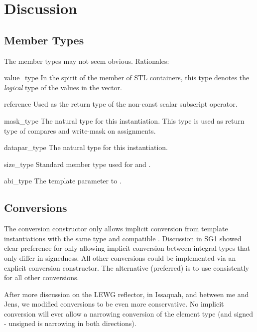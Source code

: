 \section{Discussion}

\subsection{Member Types}
The member types may not seem obvious.
Rationales:
\begin{typelist*}
  \item[value_type]
    In the spirit of the  member of STL containers, this type denotes the \emph{logical} type of the values in the vector.

  \item[reference]
    Used as the return type of the non-const scalar subscript operator.

  \item[mask_type]
    The natural \mask type for this \datapar instantiation.
    This type is used as return type of compares and write-mask on assignments.

  \item[datapar_type]
    The natural \datapar type for this \mask instantiation.

  \item[size_type]
    Standard member type used for  and .

  \item[abi_type]
    The  template parameter to \datapar.

\end{typelist*}

\subsection{Conversions}
The \datapar conversion constructor only allows implicit conversion from \datapar template instantiations with the same  type and compatible .
Discussion in SG1 showed clear preference for only allowing implicit conversion between integral types that only differ in signedness.
All other conversions could be implemented via an explicit conversion constructor.
The alternative (preferred) is to use \simdcast consistently for all other conversions.

After more discussion on the LEWG reflector, in Issaquah, and between me and Jens, we modified conversions to be even more conservative.
No implicit conversion will ever allow a narrowing conversion of the element type (and signed - unsigned is narrowing in both directions).

